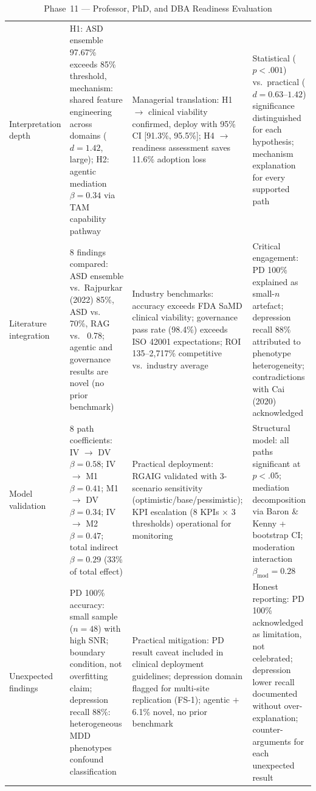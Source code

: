 \begingroup\singlespacing\tablefontsize\tablestripes
\begin{xltabular}{\textwidth}{@{} >{\raggedright\arraybackslash}p{0.14\textwidth} X X X @{}}
\caption{Phase~11 --- Professor, PhD, and DBA Readiness Evaluation}
\label{tab:phase11_readiness}\\
\toprule
{} &  &  &  \\
\midrule
\endfirsthead
\endhead
\bottomrule
\endlastfoot
Interpretation depth       & H1: ASD ensemble 97.67\% exceeds 85\% threshold, mechanism: shared feature engineering across domains ($d = 1.42$, large); H2: agentic mediation $\beta = 0.34$ via TAM capability pathway & Managerial translation: H1 $\rightarrow$ clinical viability confirmed, deploy with 95\% CI [91.3\%, 95.5\%]; H4 $\rightarrow$ readiness assessment saves 11.6\% adoption loss & Statistical ($p < .001$) vs.\ practical ($d = 0.63$--$1.42$) significance distinguished for each hypothesis; mechanism explanation for every supported path \\
\addlinespace
Literature integration     & 8 findings compared: ASD ensemble vs.\ Rajpurkar (2022) 85\%, ASD vs.\ \citet{heinsfeld2018identification} 70\%, RAG vs.\ \citet{lewis2020rag} 0.78; agentic and governance results are novel (no prior benchmark) & Industry benchmarks: accuracy exceeds FDA SaMD clinical viability; governance pass rate (98.4\%) exceeds ISO 42001 expectations; ROI 135--2{,}717\% competitive vs.\ industry average & Critical engagement: PD 100\% explained as small-$n$ artefact; depression recall 88\% attributed to phenotype heterogeneity; contradictions with Cai (2020) acknowledged \\
\addlinespace
Model validation           & 8 path coefficients: IV $\rightarrow$ DV $\beta = 0.58$; IV $\rightarrow$ M1 $\beta = 0.41$; M1 $\rightarrow$ DV $\beta = 0.34$; IV $\rightarrow$ M2 $\beta = 0.47$; total indirect $\beta = 0.29$ (33\% of total effect) & Practical deployment: RGAIG validated with 3-scenario sensitivity (optimistic/base/pessimistic); KPI escalation (8 KPIs $\times$ 3 thresholds) operational for monitoring & Structural model: all paths significant at $p < .05$; mediation decomposition via Baron \& Kenny + bootstrap CI; moderation interaction $\beta_{\text{mod}} = 0.28$ \\
\addlinespace
Unexpected findings        & PD 100\% accuracy: small sample ($n = 48$) with high SNR; boundary condition, not overfitting claim; depression recall 88\%: heterogeneous MDD phenotypes confound classification & Practical mitigation: PD result caveat included in clinical deployment guidelines; depression domain flagged for multi-site replication (FS-1); agentic $+$6.1\% novel, no prior benchmark & Honest reporting: PD 100\% acknowledged as limitation, not celebrated; depression lower recall documented without over-explanation; counter-arguments for each unexpected result \\

\end{xltabular}

